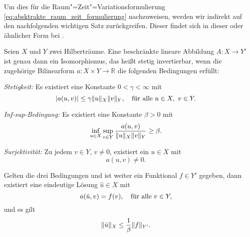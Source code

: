 \documentclass[../main.tex]{subfiles}
\begin{document}
Um dies für die Raum"=Zeit"=Variationsformulierung \cref{eq:absktrakte_raum_zeit_formulierung} nachzuweisen, werden wir indirekt auf den nachfolgenden wichtigen Satz zurückgreifen.
Dieser findet sich in dieser oder ähnlicher Form bei \textcites[Theorem 2.1]{Babuska:1971fx}[Theorem 5.2.1]{Aziz:2014wf}[Theorem \S{}3.3.6]{Braess:2007wm}.

\begin{Satz}
\label{satz:bnb_theorem}
    Seien $X$ und $Y$ zwei Hilberträume.
    Eine beschränkte lineare Abbildung $A \colon X \to Y'$ ist genau dann ein Isomorphismus, das heißt stetig invertierbar, wenn die zugehörige Bilinearform $a \colon X \times Y \to \mathbb{R}$ die folgenden Bedingungen erfüllt:
    \begin{thmenumerate}
        \item \label{satz:bnb_theorem:stetig}
        \emph{Stetigkeit:}
        Es existiert eine Konstante $0 < \gamma < \infty$ mit
        \begin{equation}
            \abs{a(u, v)} \leq \gamma \norm{u}_{X} \norm{v}_{Y}, \quad \fa u \in X,~v\in Y.
        \end{equation}
        \item \label{satz:bnb_theorem:inf_sup_bedingung}
        \emph{Inf-sup-Bedingung:}
        Es existiert eine Konstante $\beta > 0$ mit
        \begin{equation}
            \inf_{u \in X} \sup_{v \in Y} \frac{a(u, v)}{\norm{u}_{X} \norm{v}_{Y}} \geq \beta.
        \end{equation}
        \item \label{satz:bnb_theorem:surjektiv}
        \emph{Surjektivität:}
        Zu jedem $v \in Y$, $v \neq 0$, existiert ein $u \in X$ mit
        \begin{equation}
            a(u, v) \neq 0.
        \end{equation}
    \end{thmenumerate}
    Gelten die drei Bedingungen und ist weiter ein Funktional $f \in Y'$ gegeben, dann existiert eine eindeutige Lösung $\hat u \in X$ mit
    \begin{equation}
        a(\hat u, v) = f(v), \quad \fa v \in Y,
    \end{equation}
    und es gilt
    \begin{equation}
        \norm{\hat u}_{X} \leq \frac{1}{\beta} \norm{f}_{Y'}.
    \end{equation}
\end{Satz}
\end{document}
